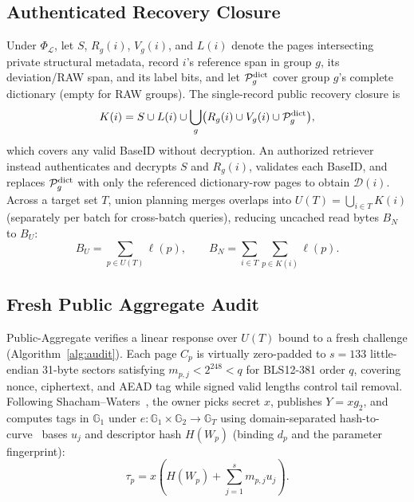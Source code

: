 \documentclass[10pt,journal]{IEEEtran}
\begin{document}
\subsection{Authenticated Recovery Closure}\label{sec:c2}
Under $\Phi_{\mathcal L}$, let $S$, $R_g(i)$, $V_g(i)$, and $L(i)$ denote the pages intersecting private structural metadata, record $i$'s reference span in group $g$, its deviation/RAW span, and its label bits, and let $\mathcal P_g^{\rm dict}$ cover group $g$'s complete dictionary (empty for RAW groups). The single-record public recovery closure is
\begin{equation}\label{eq:closure}
K(i)=S\cup L(i)\cup\bigcup_g
\bigl(R_g(i)\cup V_g(i)\cup\mathcal P_g^{\rm dict}\bigr),
\end{equation}
which covers any valid BaseID without decryption. An authorized retriever instead authenticates and decrypts $S$ and $R_g(i)$, validates each BaseID, and replaces $\mathcal P_g^{\rm dict}$ with only the referenced dictionary-row pages to obtain $\mathcal D(i)$. Across a target set $T$, union planning merges overlaps into $U(T)=\bigcup_{i\in T}K(i)$ (separately per batch for cross-batch queries), reducing uncached read bytes $B_N$ to $B_U$:
\begin{equation}\label{eq:reads}
B_U=\sum_{p\in U(T)}\ell(p),\qquad
B_N=\sum_{i\in T}\sum_{p\in K(i)}\ell(p).
\end{equation}

\subsection{Fresh Public Aggregate Audit}\label{sec:audit}
Public-Aggregate verifies a linear response over $U(T)$ bound to a fresh challenge (Algorithm~\ref{alg:audit}). Each page $C_p$ is virtually zero-padded to $s=133$ little-endian 31-byte sectors satisfying $m_{p,j}<2^{248}<q$ for BLS12-381 order $q$, covering nonce, ciphertext, and AEAD tag while signed valid lengths control tail removal. Following Shacham--Waters~\cite{ShachamWaters2013}, the owner picks secret $x$, publishes $Y=xg_2$, and computes tags in $\mathbb G_1$ under $e:\mathbb G_1\times\mathbb G_2\to\mathbb G_T$ using domain-separated hash-to-curve~\cite{RFC9380} bases $u_j$ and descriptor hash $H(W_p)$ (binding $d_p$ and the parameter fingerprint):
\begin{equation}\label{eq:tag}
\tau_p=x\left(H(W_p)+\sum_{j=1}^{s}m_{p,j}u_j\right).
\end{equation}
\end{document}
